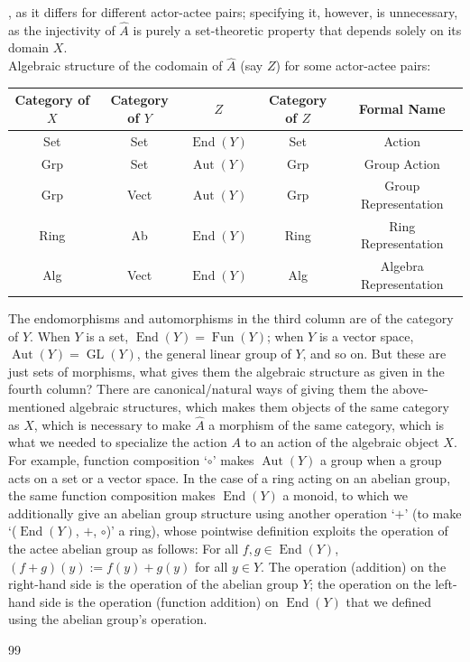 \documentclass[11pt]{amsart}
\theoremstyle{plain}
\theoremstyle{definition}
\theoremstyle{remark}
\numberwithin{equation}{section}
\begin{document}

, as it differs for different actor-actee pairs; specifying it, however, is unnecessary, as the injectivity of $\hat{A}$ is purely a set-theoretic property that depends solely on its domain $X$.\\

Algebraic structure of the codomain of $\hat{A}$ (say $Z$) for some actor-actee pairs:

\begin{table}[h]
\centering
\begin{tabular}{ccccc}
\hline
Category of $X$ & Category of $Y$ & $Z$ & Category of $Z$ & Formal Name \\
\hline
Set & Set & $\operatorname{End}(Y)$ & Set & Action \\
Grp & Set & $\operatorname{Aut}(Y)$ & Grp & Group Action \\
Grp & Vect & $\operatorname{Aut}(Y)$ & Grp & Group Representation \\
Ring & Ab & $\operatorname{End}(Y)$ & Ring & Ring Representation \\
Alg & Vect & $\operatorname{End}(Y)$ & Alg & Algebra Representation \\
\hline
\end{tabular}
\end{table}
The endomorphisms and automorphisms in the third column are of the category of $Y$. When $Y$ is a set, $\operatorname{End}(Y) = \operatorname{Fun}(Y)$; when $Y$ is a vector space, $\operatorname{Aut}(Y) = \operatorname{GL}(Y)$, the general linear group of $Y$, and so on. But these are just sets of morphisms, what gives them the algebraic structure as given in the fourth column? There are canonical/natural ways of giving them the above-mentioned algebraic structures, which makes them objects of the same category as $X$, which is necessary to make $\hat{A}$ a morphism of the same category, which is what we needed to specialize the action $A$ to an action of the algebraic object $X$.
For example, function composition `$\circ$' makes $\operatorname{Aut}(Y)$ a group when a group acts on a set or a vector space. In the case of a ring acting on an abelian group, the same function composition makes $\operatorname{End}(Y)$ a monoid, to which we additionally give an abelian group structure using another operation `$+$' (to make `($\operatorname{End}(Y)$, $+$, $\circ$)' a ring), whose pointwise definition exploits the operation of the actee abelian group as follows: For all $f,g \in \operatorname{End}(Y)$, $(f+g)(y) := f(y) + g(y)$ for all $y \in Y$. The operation (addition) on the right-hand side is the operation of the abelian group $Y$; the operation on the left-hand side is the operation (function addition) on $\operatorname{End}(Y)$ that we defined using the abelian group's operation.






\begin{thebibliography}{99}







\end{thebibliography}
\end{document}
